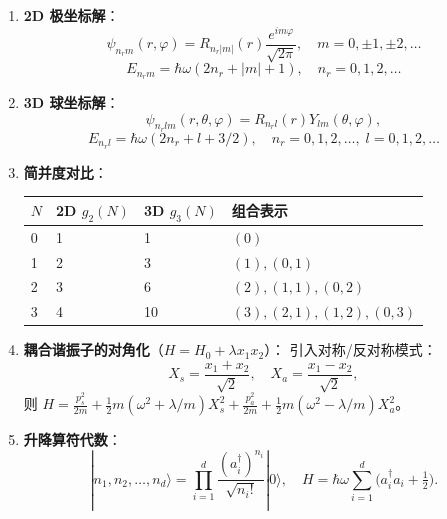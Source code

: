 \begin{formulabox}[核心公式]
\begin{enumerate}[label=\textbf{(\arabic*)}]
    \item \textbf{2D 极坐标解}：
    \[
    \psi_{n_rm}(r,\varphi)=R_{n_r|m|}(r)\frac{e^{im\varphi}}{\sqrt{2\pi}},\quad m=0,\pm1,\pm2,\ldots
    \]
    \[
    E_{n_rm}=\hbar\omega(2n_r+|m|+1),\quad n_r=0,1,2,\ldots
    \]

    \item \textbf{3D 球坐标解}：
    \[
    \psi_{n_rlm}(r,\theta,\varphi)=R_{n_rl}(r)Y_{lm}(\theta,\varphi),
    \]
    \[
    E_{n_rl}=\hbar\omega(2n_r+l+3/2),\quad n_r=0,1,2,\ldots,\;l=0,1,2,\ldots
    \]

    \item \textbf{简并度对比}：
    \begin{center}
    \begin{tabular}{llll}
    \toprule
    $N$ & 2D $g_2(N)$ & 3D $g_3(N)$ & 组合表示 \\
    \midrule
    0 & 1 & 1 & $(0)$ \\
    1 & 2 & 3 & $(1),(0,1)$ \\
    2 & 3 & 6 & $(2),(1,1),(0,2)$ \\
    3 & 4 & 10 & $(3),(2,1),(1,2),(0,3)$ \\
    \bottomrule
    \end{tabular}
    \end{center}

    \item \textbf{耦合谐振子的对角化}（$H=H_0+\lambda x_1x_2$）：
    引入对称/反对称模式：
    \[
    X_s=\frac{x_1+x_2}{\sqrt2},\quad X_a=\frac{x_1-x_2}{\sqrt2},
    \]
    则 $H=\frac{p_s^2}{2m}+\frac12m(\omega^2+\lambda/m)X_s^2+\frac{p_a^2}{2m}+\frac12m(\omega^2-\lambda/m)X_a^2$。

    \item \textbf{升降算符代数}：
    \[
    |n_1,n_2,\ldots,n_d\rangle=\prod_{i=1}^d\frac{(a_i^\dagger)^{n_i}}{\sqrt{n_i!}}|0\rangle,
    \quad H=\hbar\omega\sum_{i=1}^d\bigl(a_i^\dagger a_i+\tfrac12\bigr).
    \]
\end{enumerate}
\end{formulabox}

